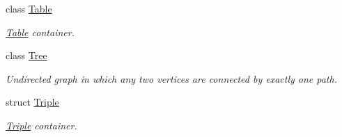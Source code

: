 \begin{DoxyCompactItemize}
class \hyperlink{classlibrary_1_1core_1_1ctnr_1_1Table}{Table}
\begin{DoxyCompactList}\small\item\em \hyperlink{classlibrary_1_1core_1_1ctnr_1_1Table}{Table} container. \end{DoxyCompactList}\item 
class \hyperlink{classlibrary_1_1core_1_1ctnr_1_1Tree}{Tree}
\begin{DoxyCompactList}\small\item\em Undirected graph in which any two vertices are connected by exactly one path. \end{DoxyCompactList}\item 
struct \hyperlink{structlibrary_1_1core_1_1ctnr_1_1Triple}{Triple}
\begin{DoxyCompactList}\small\item\em \hyperlink{structlibrary_1_1core_1_1ctnr_1_1Triple}{Triple} container. \end{DoxyCompactList}\end{DoxyCompactItemize}
